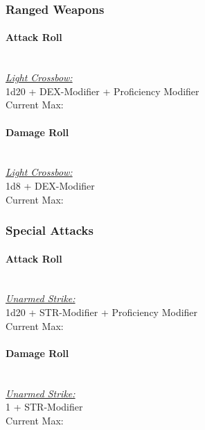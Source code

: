 \documentclass[letterpaper,openany,oneside,twocolumn]{book}
\newcommand{\PATH}{../../}
\begin{document}
\subsubsection*{Ranged Weapons}
\paragraph*{Attack Roll}\hfill\\
\underline{\textit{Light Crossbow:}}\\
1d20 + DEX-Modifier + Proficiency Modifier\\
\indent Current Max: 
\paragraph*{Damage Roll}\hfill\\
\underline{\textit{Light Crossbow:}}\\
1d8 + DEX-Modifier\\
\indent Current Max: 
\subsubsection*{Special Attacks}
\paragraph*{Attack Roll}\hfill\\
\underline{\textit{Unarmed Strike:}}\\
1d20 + STR-Modifier + Proficiency Modifier\\
\indent Current Max: 
\paragraph*{Damage Roll}\hfill\\
\underline{\textit{Unarmed Strike:}}\\
1 + STR-Modifier\\
\indent Current Max: 

%
\end{document}
